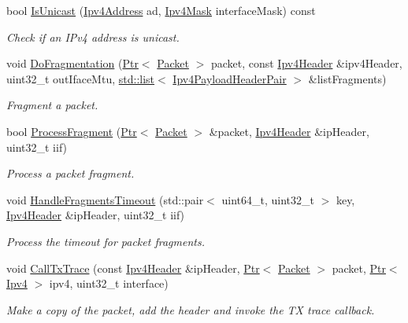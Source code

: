 \begin{DoxyCompactItemize}
bool \hyperlink{classns3_1_1Ipv4L3Protocol_a533891c3db9bb974dba7dc4b530b12ab}{Is\+Unicast} (\hyperlink{classns3_1_1Ipv4Address}{Ipv4\+Address} ad, \hyperlink{classns3_1_1Ipv4Mask}{Ipv4\+Mask} interface\+Mask) const 
\begin{DoxyCompactList}\small\item\em Check if an I\+Pv4 address is unicast. \end{DoxyCompactList}\item 
void \hyperlink{classns3_1_1Ipv4L3Protocol_a5ea602dc1447746c0c3bd90e36ec3888}{Do\+Fragmentation} (\hyperlink{classns3_1_1Ptr}{Ptr}$<$ \hyperlink{classns3_1_1Packet}{Packet} $>$ packet, const \hyperlink{classns3_1_1Ipv4Header}{Ipv4\+Header} \&ipv4\+Header, uint32\+\_\+t out\+Iface\+Mtu, \hyperlink{openflow-interface_8h_afd9bcfa176617760671b67580f536fa7}{std\+::list}$<$ \hyperlink{classns3_1_1Ipv4L3Protocol_a2bf61de1f7739b9ce8b1dac10fb14b31}{Ipv4\+Payload\+Header\+Pair} $>$ \&list\+Fragments)
\begin{DoxyCompactList}\small\item\em Fragment a packet. \end{DoxyCompactList}\item 
bool \hyperlink{classns3_1_1Ipv4L3Protocol_a981e183413dccdf40f91d1de4f728f63}{Process\+Fragment} (\hyperlink{classns3_1_1Ptr}{Ptr}$<$ \hyperlink{classns3_1_1Packet}{Packet} $>$ \&packet, \hyperlink{classns3_1_1Ipv4Header}{Ipv4\+Header} \&ip\+Header, uint32\+\_\+t iif)
\begin{DoxyCompactList}\small\item\em Process a packet fragment. \end{DoxyCompactList}\item 
void \hyperlink{classns3_1_1Ipv4L3Protocol_a387d96062b7810153592f3a6f257de74}{Handle\+Fragments\+Timeout} (std\+::pair$<$ uint64\+\_\+t, uint32\+\_\+t $>$ key, \hyperlink{classns3_1_1Ipv4Header}{Ipv4\+Header} \&ip\+Header, uint32\+\_\+t iif)
\begin{DoxyCompactList}\small\item\em Process the timeout for packet fragments. \end{DoxyCompactList}\item 
void \hyperlink{classns3_1_1Ipv4L3Protocol_a04cbb7540c6f22a2870f118715b6a703}{Call\+Tx\+Trace} (const \hyperlink{classns3_1_1Ipv4Header}{Ipv4\+Header} \&ip\+Header, \hyperlink{classns3_1_1Ptr}{Ptr}$<$ \hyperlink{classns3_1_1Packet}{Packet} $>$ packet, \hyperlink{classns3_1_1Ptr}{Ptr}$<$ \hyperlink{classns3_1_1Ipv4}{Ipv4} $>$ ipv4, uint32\+\_\+t interface)
\begin{DoxyCompactList}\small\item\em Make a copy of the packet, add the header and invoke the TX trace callback. \end{DoxyCompactList}\end{DoxyCompactItemize}
